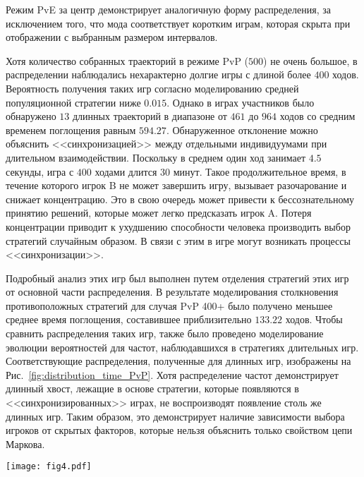Режим PvE за центр демонстрирует аналогичную форму распределения, за исключением того, что мода соответствует коротким играм, которая скрыта при отображении с выбранным размером интервалов.

Хотя количество собранных траекторий в режиме PvP ($500$) не очень большое, в распределении наблюдались нехарактерно долгие игры с длиной более $400$ ходов. Вероятность получения таких игр согласно моделированию средней популяционной стратегии ниже $0.015$. Однако в играх участников было обнаружено $13$ длинных траекторий в диапазоне от $461$ до $964$ ходов со средним временем поглощения равным $594.27$. Обнаруженное отклонение можно объяснить <<синхронизацией>> между отдельными индивидуумами при длительном взаимодействии. Поскольку в среднем один ход занимает $4.5$ секунды, игра с $400$ ходами длится $30$ минут. Такое продолжительное время, в течение которого игрок B не может завершить игру, вызывает разочарование и снижает концентрацию. Это в свою очередь может привести к бессознательному принятию решений, которые может легко предсказать игрок A. Потеря концентрации приводит к ухудшению способности человека производить выбор стратегий случайным образом. В связи с этим в игре могут возникать процессы <<синхронизации>>.

Подробный анализ этих игр был выполнен путем отделения стратегий этих игр от основной части распределения. В результате моделирования столкновения противоположных стратегий для случая PvP 400+ было получено меньшее среднее время поглощения, составившее приблизительно $133.22$ ходов. Чтобы сравнить распределения таких игр, также было проведено моделирование эволюции вероятностей для частот, наблюдавшихся в стратегиях длительных игр. Соответствующие распределения, полученные для длинных игр, изображены на Рис.~\cref{fig:distribution_time_PvP}. Хотя распределение частот демонстрирует длинный хвост, лежащие в основе стратегии, которые появляются в <<синхронизированных>> играх, не воспроизводят появление столь же длинных игр. Таким образом, это демонстрирует наличие зависимости выбора игроков от скрытых факторов, которые нельзя объяснить только свойством цепи Маркова.

\begin{figure*}[t]
    \centering
    \texttt{[image: fig4.pdf]}
    \caption{
        Распределение времени поглощения для режима PvP (желтая гистограмма и фиолетовая линия) по сравнению с моделированием частот направлений движения (зеленая линия) и частот стратегий (синяя линия), наблюдаемых в длительных играх (более $400$ ходов). Частоты направлений движения для каждого состояния, полученные в экспериментальных длинных играх, использовались для моделирования эволюции вероятностей найти фишку в узлах решетки. Стратегии обоих игроков A и B в PvP с длиной ходов более $400$ использовались отдельно при моделировании.
    }  
    \label{fig:distribution_time_PvP}

\end{figure*}


